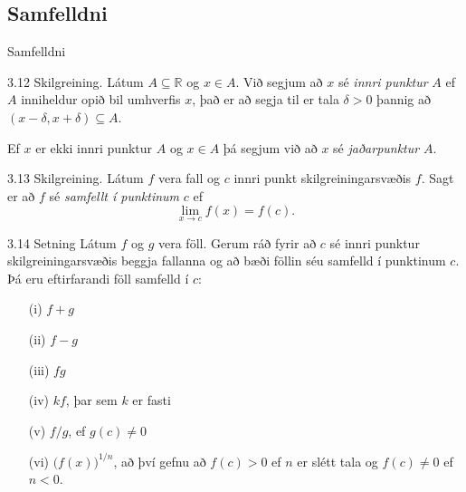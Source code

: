 \documentclass[icelandic,a4paper,12pt]{article}
\newcommand{\R}{{\mathbb  R}}
\begin{document}
\subsection*{Samfelldni}

\begin{frame}{Samfelldni}
\pause
 \begin{block}{3.12 Skilgreining.}
Látum $A\subseteq \R$ og $x\in A$.  Við segjum að $x$ sé {\em innri
  punktur} $A$ ef $A$ inniheldur opið bil umhverfis $x$, það er að
segja til er tala $\delta>0$ þannig að $(x-\delta, x+\delta)\subseteq
A$. 

\pause

Ef $x$ er ekki innri punktur $A$ og $x\in A$ þá segjum við að $x$ sé
{\em jaðarpunktur} $A$.

\pause

\end{block}

\begin{block}{3.13 Skilgreining.}
Látum $f$ vera fall og $c$ innri punkt skilgreiningarsvæðis $f$.  Sagt
er að $f$ sé {\em samfellt í punktinum} $c$ ef
$$\lim_{x\rightarrow c}f(x)=f(c).$$
\end{block}
\end{frame}

\begin{frame}
 \begin{block}{3.14 Setning}
 Látum $f$ og $g$ vera föll.  Gerum ráð fyrir að $c$ sé innri punktur
skilgreiningarsvæðis beggja fallanna og að bæði föllin séu samfelld í
punktinum $c$.  Þá eru eftirfarandi föll samfelld í $c$:
\begin{itemize}
\pause
\item[(i)] $f+g$ %
\pause
\item[(ii)] $f-g$
\pause
\item[(iii)] $fg$
\pause
\item[(iv)] $kf$, þar sem $k$ er fasti
\pause
\item[(v)]  $f/g$, ef $g(c)\neq 0$
\pause
\item[(vi)]  $\Big(f(x)\Big)^{1/n}$, að því gefnu að 
$f(c)>0$ ef $n$ er slétt tala og $f(c)\neq 0$ ef $n<0$.
\end{itemize} 
\end{block}
\end{frame}
\end{document}
